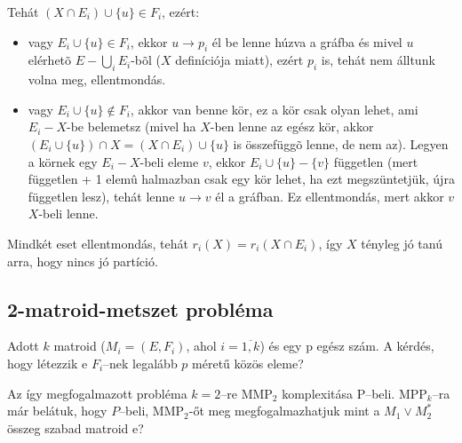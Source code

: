 Tehát $(X \cap E_i) \cup \{u\} \in F_i$, ezért:

\begin{itemize}
  \item vagy $E_i \cup \{u\} \in F_i$, ekkor $u \rightarrow p_i$ él be lenne
  húzva a gráfba és mivel $u$ elérhetõ $E - \bigcup_i E_i$-bõl ($X$ definíciója
  miatt), ezért $p_i$ is, tehát nem álltunk volna meg, ellentmondás.
  \item vagy $E_i \cup \{u\} \not\in F_i$, akkor van benne kör, ez a kör csak
  olyan lehet, ami $E_i-X$-be belemetsz (mivel ha $X$-ben lenne az egész kör,
  akkor $(E_i \cup \{u\})\cap X = (X \cap E_i) \cup \{u\}$ is összefüggõ lenne,
  de nem az). Legyen a körnek egy $E_i-X$-beli eleme $v$, ekkor $E_i \cup \{u\}
  - \{v\}$ független (mert független + 1 elemû halmazban csak egy kör lehet, ha
  ezt megszüntetjük, újra független lesz), tehát lenne $u \rightarrow v$ él a
  gráfban. Ez ellentmondás, mert akkor $v$ $X$-beli lenne.
\end{itemize}

Mindkét eset ellentmondás, tehát $r_i(X) = r_i(X \cap E_i)$, így $X$ tényleg jó
tanú arra, hogy nincs jó partíció.

\subsection{2-matroid-metszet probléma}

Adott $k$ matroid ($M_i=(E,F_i)$, ahol $i=\overline{1,k}$) és egy p egész szám.
A kérdés, hogy létezzik e $F_i$--nek legalább $p$ méretű közös eleme?

Az így megfogalmazott probléma $k=2$--re MMP$_2$ komplexitása P--beli.
MPP$_k$--ra már belátuk, hogy $P$--beli, MMP$_2$-őt meg megfogalmazhatjuk mint a
$M_1 \vee M_2^*$ összeg szabad matroid e?
